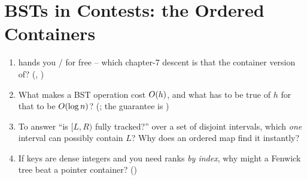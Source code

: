 \section{BSTs in Contests: the Ordered Containers}\label{sec:c05-contests}

\begin{previouslybox}
\begin{enumerate}[nosep, leftmargin=1.6em]
  \item {} hands you / for free -- which chapter-7
        descent is that the container version of? (, )
  \item What makes a BST operation cost $O(h)$, and what has to be true of $h$ for that to be
        $O(\log n)$? (; the guarantee is )
  \item To answer ``is $[L,R)$ fully tracked?'' over a set of disjoint intervals, which \emph{one}
        interval can possibly contain $L$? Why does an ordered map find it instantly?
  \item If keys are dense integers and you need ranks \emph{by index}, why might a Fenwick tree beat
        a pointer container? ()
\end{enumerate}
\end{previouslybox}

